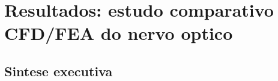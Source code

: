 %
%

\section{Resultados: estudo comparativo CFD/FEA do nervo optico}
\label{sec:resultados-sans}

\subsection{Sintese executiva}
\label{sec:resultados-sintese}

